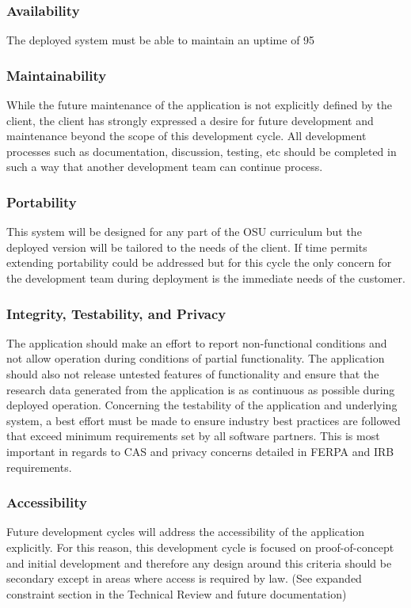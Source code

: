 \documentclass[onecolumn, draftclsnofoot,10pt, compsoc]{IEEEtran}
\begin{document}
\subsubsection{Availability}
The deployed system must be able to maintain an uptime of 95%

\subsubsection{Maintainability}
While the future maintenance of the application is not explicitly defined by the client, the client has strongly expressed a desire for future development and maintenance beyond the scope of this development cycle. All development processes such as documentation, discussion, testing, etc should be completed in such a way that another development team can continue process. 

\subsubsection{Portability}
This system will be designed for any part of the OSU curriculum but the deployed version will be tailored to the needs of the client. If time permits extending portability could be addressed but for this cycle the only concern for the development team during deployment is the immediate needs of the customer.

\subsubsection{Integrity, Testability, and Privacy}
The application should make an effort to report non-functional conditions and not allow operation during conditions of partial functionality. The application should also not release untested features of functionality and ensure that the research data generated from the application is as continuous  as possible during deployed operation. Concerning the testability of the application and underlying system, a best effort must be made to ensure industry best practices are followed that exceed minimum requirements set by all software partners. This is most important in regards to CAS and privacy concerns detailed in FERPA and IRB requirements. 

\subsubsection{Accessibility}
Future development cycles will address the accessibility of the application explicitly. For this reason, this development cycle is focused on proof-of-concept and initial development and therefore any  design around this criteria should be secondary except in areas where access is required by law. (See expanded constraint section in the Technical Review and future documentation)
\end{document}
